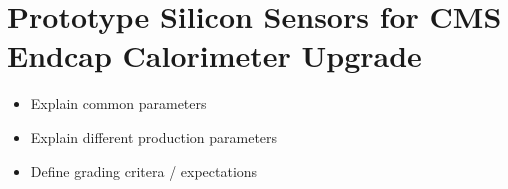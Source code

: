 \section{Prototype Silicon Sensors for CMS Endcap Calorimeter Upgrade}
\label{sec:sensors}

\begin{itemize}
    \item Explain common parameters
    \item Explain different production parameters
    \item Define grading critera / expectations
\end{itemize}